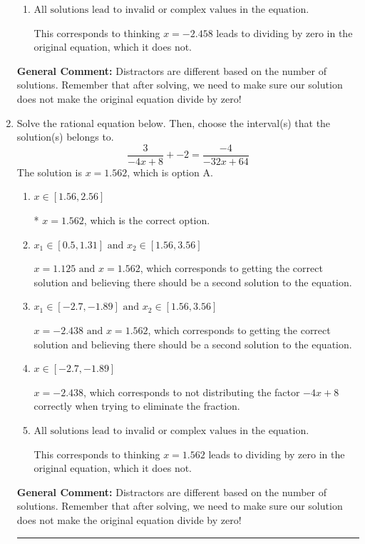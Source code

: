 \documentclass{extbook}[14pt]
\newcommand{\litem}[1]{\item #1

\rule{\textwidth}{0.4pt}}
\begin{document}
\begin{enumerate}
{\begin{enumerate}[label=\Alph*.]
$x = -2.458 \text{ and } x = 2.042$, which corresponds to getting the correct solution and believing there should be a second solution to the equation.
\item \( \text{All solutions lead to invalid or complex values in the equation.} \)

This corresponds to thinking $x = -2.458$ leads to dividing by zero in the original equation, which it does not.
\end{enumerate}

\textbf{General Comment:} Distractors are different based on the number of solutions. Remember that after solving, we need to make sure our solution does not make the original equation divide by zero!
}
\litem{
Solve the rational equation below. Then, choose the interval(s) that the solution(s) belongs to.
\[ \frac{3}{-4x + 8} + -2 = \frac{-4}{-32x + 64} \]The solution is \( x = 1.562 \), which is option A.\begin{enumerate}[label=\Alph*.]
\item \( x \in [1.56,2.56] \)

* $x = 1.562$, which is the correct option.
\item \( x_1 \in [0.5, 1.31] \text{ and } x_2 \in [1.56,3.56] \)

$x = 1.125 \text{ and } x = 1.562$, which corresponds to getting the correct solution and believing there should be a second solution to the equation.
\item \( x_1 \in [-2.7, -1.89] \text{ and } x_2 \in [1.56,3.56] \)

$x = -2.438 \text{ and } x = 1.562$, which corresponds to getting the correct solution and believing there should be a second solution to the equation.
\item \( x \in [-2.7,-1.89] \)

$x = -2.438$, which corresponds to not distributing the factor $-4x + 8$ correctly when trying to eliminate the fraction.
\item \( \text{All solutions lead to invalid or complex values in the equation.} \)

This corresponds to thinking $x = 1.562$ leads to dividing by zero in the original equation, which it does not.
\end{enumerate}

\textbf{General Comment:} Distractors are different based on the number of solutions. Remember that after solving, we need to make sure our solution does not make the original equation divide by zero!
}
\end{enumerate}
\end{document}
